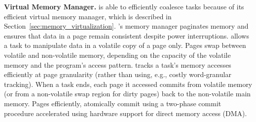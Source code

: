 
\textbf{\sys Virtual Memory Manager.} 
\sys is able to efficiently coalesce tasks because of its efficient virtual
memory manager,
%
which is described in Section~\ref{sec:memory_virtualization}. 
%
\sys's memory manager paginates memory and ensures that data in a page remain consistent
despite power interruptions. 
%
\sys allows a task to manipulate data in a volatile copy of a page only.
%
Pages swap between volatile and non-volatile memory, depending on the capacity
of the volatile memory and the program's access pattern. 
%
\sys tracks a task's memory accesses efficiently at page granularity (rather
than using, e.g., costly word-granular tracking).
%
When a task ends, each page it accessed commits from volatile memory (or from a
non-volatile swap region for dirty pages) back to the non-volatile main memory.
%
Pages efficiently, atomically commit using a two-phase commit procedure
accelerated using hardware support for direct memory access (DMA). 
%



